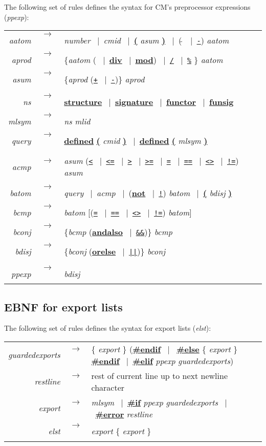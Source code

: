 \documentclass[titlepage,letterpaper]{article}
\newcommand{\nt}[1]{{\it #1}}
\newcommand{\tl}[1]{{\underline{\bf #1}}}
\newcommand{\ttl}[1]{{\underline{\tt #1}}}
\newcommand{\ar}{$\rightarrow$\ }
\newcommand{\vb}{~$|$~}
\begin{document}
\noindent The following set of rules defines the syntax for CM's
preprocessor expressions (\nt{ppexp}):

\begin{tabular}{rcl}
\nt{aatom}  &\ar& \nt{number} \vb \nt{cmid} \vb \tl{(} \nt{asum} \tl{)} \vb (\ttl{$\tilde{~}$} \vb \ttl{-}) \nt{aatom} \\
\nt{aprod}  &\ar& \{\nt{aatom} (\ttl{*} \vb \tl{div} \vb \tl{mod}) \vb \ttl{/} \vb \ttl{\%} \} \nt{aatom} \\
\nt{asum}   &\ar& \{\nt{aprod} (\ttl{+} \vb \ttl{-})\} \nt{aprod} \\
\\
\nt{ns}     &\ar& \tl{structure} \vb \tl{signature} \vb \tl{functor} \vb \tl{funsig} \\
\nt{mlsym}  &\ar& \nt{ns} \nt{mlid} \\
\nt{query}  &\ar& \tl{defined} \tl{(} \nt{cmid} \tl{)} \vb \tl{defined} \tl{(} \nt{mlsym} \tl{)} \\
\\
\nt{acmp}   &\ar& \nt{asum} (\ttl{<} \vb \ttl{<=} \vb \ttl{>} \vb \ttl{>=} \vb \ttl{=} \vb \ttl{==} \vb \ttl{<>} \vb \ttl{!=}) \nt{asum} \\
\\
\nt{batom}  &\ar& \nt{query} \vb \nt{acmp} \vb (\tl{not} \vb \ttl{!}) \nt{batom} \vb \tl{(} \nt{bdisj} \tl{)} \\
\nt{bcmp}   &\ar& \nt{batom} [(\ttl{=} \vb \ttl{==} \vb \ttl{<>} \vb \ttl{!=}) \nt{batom}] \\
\nt{bconj}  &\ar& \{\nt{bcmp} (\tl{andalso} \vb \ttl{\&\&})\} \nt{bcmp} \\
\nt{bdisj}  &\ar& \{\nt{bconj} (\tl{orelse} \vb \ttl{||})\} \nt{bconj} \\
\\
\nt{ppexp} &\ar& \nt{bdisj}
\end{tabular}

\subsection{EBNF for export lists}

The following set of rules defines the syntax for export lists (\nt{elst}):

\begin{tabular}{rcl}
\nt{guardedexports} &\ar& \{ \nt{export} \} (\tl{\#endif} \vb
\tl{\#else} \{ \nt{export} \} \tl{\#endif} \vb \tl{\#elif} \nt{ppexp}
\nt{guardedexports}) \\
\nt{restline}      &\ar& rest of current line up to next newline character \\
\nt{export}        &\ar& \nt{mlsym} \vb \tl{\#if} \nt{ppexp}
\nt{guardedexports} \vb \tl{\#error} \nt{restline}  \\
\nt{elst}       &\ar& \nt{export} \{ \nt{export} \} \\
\end{tabular}
\end{document}
